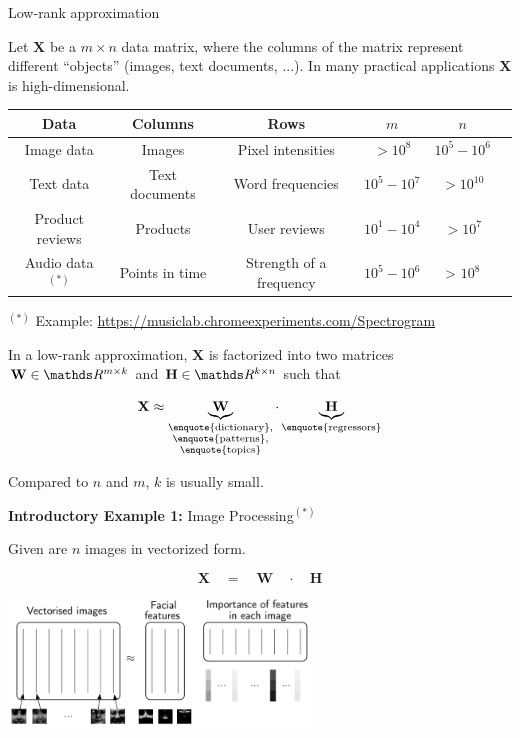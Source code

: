 \begin{vbframe}{Low-rank approximation}

Let $\mathbf{X}$ be a $m \times n$ data matrix, where the columns of the matrix represent different \enquote{objects} (images, text documents, ...). In many practical applications $\mathbf{X}$ is high-dimensional.

\begin{footnotesize}
\begin{table}[]
\centering
\begin{tabular}{cccccc}
Data & Columns & Rows & $m$ & $n$\\
\hline
Image data & Images & Pixel intensities & $> 10^{8}$ & $10^5 - 10^6$\\
Text data & Text documents & Word frequencies & $10^5 - 10^7$ & $> 10^{10}$\\
Product reviews & Products & User reviews  & $10^1 - 10^4$ & $> 10^{7}$ \\
Audio data$^{(*)}$ & Points in time & Strength of a frequency & $10^5 - 10^6$ & > $10^{8}$
\end{tabular}
\end{table}
\end{footnotesize}

\vfill
\begin{footnotesize}
$^{(*)}$ Example: \url{https://musiclab.chromeexperiments.com/Spectrogram}
\end{footnotesize}

\framebreak

In a low-rank approximation, $\mathbf{X}$ is factorized into two matrices $\mathbf{W} \in \R^{m \times k}$ and $\mathbf{H} \in \R^{k \times n}$ such that

$$
\mathbf{X} \approx \underbrace{\mathbf{W}}_{\substack{\text{\enquote{dictionary},}\\ \text{\enquote{patterns},} \\ \text{\enquote{topics}}}} \cdot \underbrace{\mathbf{H}}_{\text{\enquote{regressors}}}
$$

Compared to $n$ and $m$, $k$ is usually small.

\framebreak

\textbf{Introductory Example 1:} Image Processing$^{(*)}$

\lz

Given are $n$ images in vectorized form.

$$
\bm{X} \quad = \quad \bm{W} \quad \cdot \quad \bm{H}
$$
\begin{center}
\includegraphics[width=0.6\textwidth]{figure_man/ignore/pixel.png}
\end{center}


\end{vbframe}
